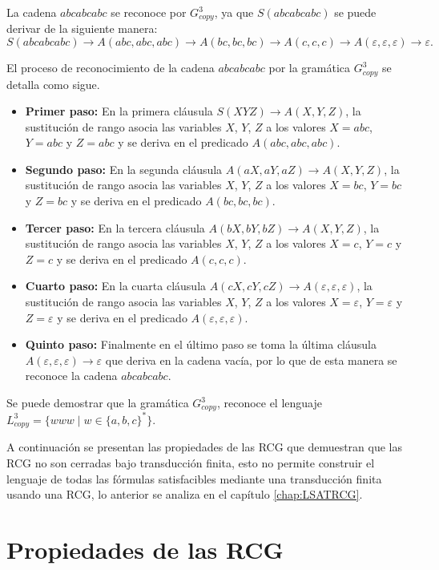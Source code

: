\documentclass[12pt]{article}
\begin{document}
La cadena $abcabcabc$ se reconoce por $G^3_{copy}$, ya que $S(abcabcabc)$ se puede derivar de la siguiente manera:
$$S(abcabcabc)\to A(abc,abc,abc)\to A(bc,bc,bc)\to A(c,c,c)\to A(\varepsilon,\varepsilon,\varepsilon)\to \varepsilon.$$

El proceso de reconocimiento de la cadena $abcabcabc$ por la gramática $G^3_{copy}$ se detalla como sigue.

\begin{itemize}
    \item \textbf{Primer paso:} En la primera cláusula $S(XYZ)\to A(X,Y,Z)$, la sustitución de rango asocia las
          variables $X$, $Y$, $Z$ a los valores $X=abc$, $Y=abc$ y $Z=abc$ y se deriva en el predicado $A(abc,abc,abc)$.
    \item \textbf{Segundo paso:} En la segunda cláusula $A(aX,aY,aZ)\to A(X,Y,Z)$, la sustitución de rango asocia las
          variables $X$, $Y$, $Z$ a los valores $X=bc$, $Y=bc$ y $Z=bc$ y se deriva en el predicado $A(bc,bc,bc)$.
    \item \textbf{Tercer paso:} En la tercera cláusula $A(bX,bY,bZ)\to A(X,Y,Z)$, la sustitución de rango asocia las
          variables $X$, $Y$, $Z$ a los valores $X=c$, $Y=c$ y $Z=c$ y se deriva en el predicado $A(c,c,c)$.
    \item \textbf{Cuarto paso:} En la cuarta cláusula $A(cX,cY,cZ)\to A(\varepsilon,\varepsilon,\varepsilon)$, la sustitución de rango asocia las
          variables $X$, $Y$, $Z$ a los valores $X=\varepsilon$, $Y=\varepsilon$ y $Z=\varepsilon$ y se deriva en el predicado $A(\varepsilon,\varepsilon,\varepsilon)$.
    \item \textbf{Quinto paso:} Finalmente en el último paso se toma la última
          cláusula $A(\varepsilon,\varepsilon,\varepsilon)\to \varepsilon$ que deriva en la cadena vacía, por lo que de esta manera se reconoce la cadena $abcabcabc$.
\end{itemize}

Se puede demostrar que la gramática $G^3_{copy}$, reconoce el lenguaje $L_{copy}^3=\{www\mid w\in \{a,b,c\}^*\}$.

A continuación se presentan las propiedades de las RCG que demuestran
que las RCG no son cerradas bajo transducción finita, esto no permite construir el lenguaje de todas las fórmulas
satisfacibles mediante una transducción finita usando una RCG, lo anterior se analiza en el capítulo \ref{chap:LSATRCG}.

\section{Propiedades de las RCG}
\end{document}
